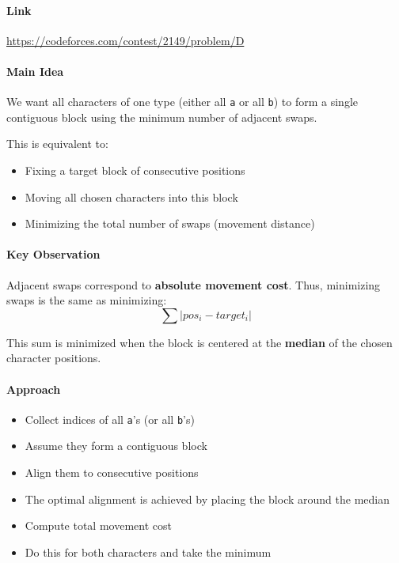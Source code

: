 \documentclass[11pt]{article}
\begin{document}
\paragraph{Link}
\url{https://codeforces.com/contest/2149/problem/D}

\paragraph{Main Idea}

We want all characters of one type (either all \texttt{a} or all \texttt{b})
to form a single contiguous block using the minimum number of adjacent swaps.

This is equivalent to:
\begin{itemize}
    \item Fixing a target block of consecutive positions
    \item Moving all chosen characters into this block
    \item Minimizing the total number of swaps (movement distance)
\end{itemize}

\paragraph{Key Observation}

Adjacent swaps correspond to \textbf{absolute movement cost}.
Thus, minimizing swaps is the same as minimizing:
\[
\sum |pos_i - target_i|
\]

This sum is minimized when the block is centered at the \textbf{median}
of the chosen character positions.

\paragraph{Approach}

\begin{itemize}
    \item Collect indices of all \texttt{a}'s (or all \texttt{b}'s)
    \item Assume they form a contiguous block
    \item Align them to consecutive positions
    \item The optimal alignment is achieved by placing the block around the median
    \item Compute total movement cost
    \item Do this for both characters and take the minimum
\end{itemize}
\end{document}
